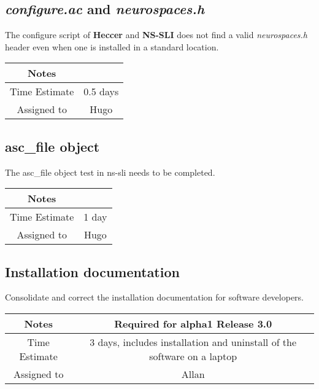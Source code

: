 \documentclass[12pt]{article}
\begin{document}
\subsection{{\it configure.ac} and {\it neurospaces.h}}

The configure script of {\bf Heccer} and {\bf NS-SLI} does not find a valid
{\it neurospaces.h} header even when one is installed in a standard
location.

{
  \vspace{5mm}
  \centering
  \begin{tabular}{|c|c|}
    \hline
    Notes
    & \\
    \hline
    Time Estimate
    & 0.5 days \\
    \hline
    Assigned to
    & Hugo \\
    \hline
  \end{tabular}
}


\subsection{asc\_file object}

The asc\_file object test in ns-sli needs to be completed.

{
  \vspace{5mm}
  \centering
  \begin{tabular}{|c|c|}
    \hline
    Notes
    & \\
    \hline
    Time Estimate
    & 1 day \\
    \hline
    Assigned to
    & Hugo \\
    \hline
  \end{tabular}
}


\subsection{Installation documentation}

Consolidate and correct the installation documentation for software
developers.

{
  \vspace{5mm}
  \centering
  \begin{tabular}{|c|c|}
    \hline
    Notes
    & Required for alpha1 Release 3.0 \\
    \hline
    Time Estimate
    & 3 days, includes installation and uninstall of the software on a laptop \\
    \hline
    Assigned to
    & Allan \\
    \hline
  \end{tabular}
}
\end{document}
